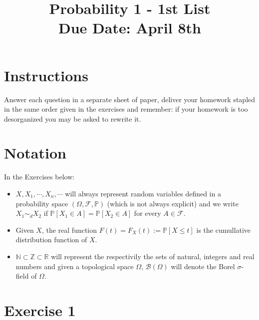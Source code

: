 \documentclass[a4paper,10pt]{article}
\title{Probability 1 - 1st List \\ Due Date: April 8th}
\author{}
\date{}
\newcommand{\F}{\mathcal{F}}
\newcommand{\Pro}{\mathbb{P}}
\newcommand{\N}{\mathbb{N}}
\newcommand{\Z}{\mathbb{Z}}
\newcommand{\R}{\mathbb{R}}
\newcommand{\B}{\mathcal{B}}
\begin{document}
\maketitle

\section*{Instructions}

Answer each question in a separate sheet of paper, deliver your homework stapled in the same order given in the exercises and 
remember: if your homework is too desorganized you may be asked to rewrite it.


\section*{Notation}

In the Exercises below:

\begin{itemize}
 \item $X,X_1,\cdots, X_n, \cdots$ will always represent random variables defined in a probability space $(\Omega, \F,\Pro)$ (which is not always explicit)
 and we write $X_1 \sim_d X_2$ if $\Pro[X_1\in A]=\Pro[X_2\in A]$ for every $A\in \F$.
 \item Given $X$, the real function $F(t)=F_X(t):=\Pro[X \leq t]$ is the cumullative distribution function of $X$.
 \item $\N \subset \Z \subset \R$ will represent the respectivily the sets of natural, integers and real numbers and given a topological space $\Omega$, 
 $\B(\Omega)$ will denote the Borel $\sigma$-field of $\Omega$.
\end{itemize}




\section*{Exercise 1}
\end{document}
